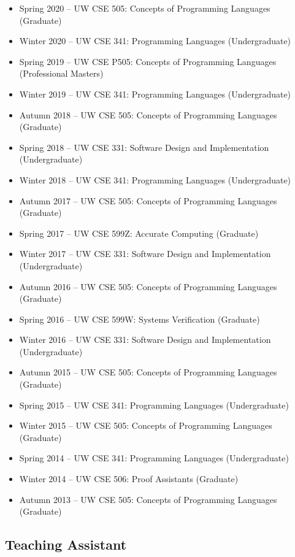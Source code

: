 \documentclass[10pt]{article}
\begin{document}
\begin{itemize}
  \item Spring 2020 -- UW CSE 505: Concepts of Programming Languages (Graduate)
  \item Winter 2020 -- UW CSE 341: Programming Languages (Undergraduate)
  \item Spring 2019 -- UW CSE P505: Concepts of Programming Languages (Professional Masters)
  \item Winter 2019 -- UW CSE 341: Programming Languages (Undergraduate)
  \item Autumn 2018 -- UW CSE 505: Concepts of Programming Languages (Graduate)
  \item Spring 2018 -- UW CSE 331: Software Design and Implementation (Undergraduate)
  \item Winter 2018 -- UW CSE 341: Programming Languages (Undergraduate)
  \item Autumn 2017 -- UW CSE 505: Concepts of Programming Languages (Graduate)
  \item Spring 2017 -- UW CSE 599Z: Accurate Computing (Graduate)
  \item Winter 2017 -- UW CSE 331: Software Design and Implementation (Undergraduate)
  \item Autumn 2016 -- UW CSE 505: Concepts of Programming Languages (Graduate)
  \item Spring 2016 -- UW CSE 599W: Systems Verification (Graduate)
  \item Winter 2016 -- UW CSE 331: Software Design and Implementation (Undergraduate)
  \item Autumn 2015 -- UW CSE 505: Concepts of Programming Languages (Graduate)
  \item Spring 2015 -- UW CSE 341: Programming Languages (Undergraduate)
  \item Winter 2015 -- UW CSE 505: Concepts of Programming Languages (Graduate)
  \item Spring 2014 -- UW CSE 341: Programming Languages (Undergraduate)
  \item Winter 2014 -- UW CSE 506: Proof Assistants (Graduate)
  \item Autumn 2013 -- UW CSE 505: Concepts of Programming Languages (Graduate)
\end{itemize}

\subsection*{Teaching Assistant}
\end{document}
